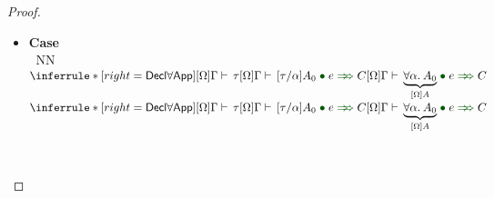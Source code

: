 \documentclass[a4paper]{article}
\makeatletter
\newcommand{\mathcolor}[2]{\text{\textcolor{#1}{\ensuremath{#2}}}}
\def\CompactJudgments{0}
\newcommand{\entails}{\mathrel{\ifnum\CompactJudgments=1\vdash \else \vdash\,\fi}}
\newcommand{\ctxoutsym}{\ifnum\CompactJudgments=1\dashv \else \,\dashv \fi}
\newcommand{\ctxout}[1]{\mathrel{\ctxoutsym}{#1}}
\newcommand{\Lemmaref}[1]{Lemma \ref{#1} (\nameref{#1})}   \newcommand{\Lemref}[1]{\Lemma \ref{#1}}   \newcommand{\Conjectureref}[1]{Conjecture \ref{#1}}
\gdef\xxDerivationProofCaseColor{N}
\newcommand{\DerivationProofCase}[3]{\smallskip
     \item \parbox[t]{100ex}{\textbf{Case } \\[-0.5em]
       $~$\hspace{5ex}
       \if\xxDerivationProofCaseColor N\ensuremath{\Infer{#1}{#2}{#3}}
       \else \colorbox{\xxDerivationProofCaseColor}{\ensuremath{\Infer{#1}{#2}{#3}}}\fi }\nopagebreak \\[-0.8ex]
  }
\newcommand{\BeginProof}{\renewcommand{\arraystretch}{1.1} \begin{tabular}[b]{r@{}r @{} l  l}}
\newcommand{\EndProof}{\end{tabular} \renewcommand{\arraystretch}{\mydefaultarraystretch}}
\newcommand{\Hand}{\text{\Pointinghand~~~~}}
\newcommand{\Pf}[4] {&$#1$ $#2$\, & $#3$ & #4 \\}
\newcommand{\Pfmrg}[3] {&$#1$\, & $#2$ & #3 \\}
\newcommand{\mkpf}[4] {\Pf{#2}{#1\,}{#3}{#4}}
\newcommand{\eqPf}[3] {\mkpf{=}{#1}{#2}{#3}}
\newcommand{\proofsep}{\,\\[-0.5em]}
\newenvironment{llproof}{\BeginProof}{\EndProof}
\newcommand{\ditto}{\ensuremath{''}}
\newcommand{\AllSym}{\forall}
\newcommand{\xAll}[1]{\AllSym#1}
\newcommand{\All}[1]{\xAll{#1}.\:}
\newcommand{\Infer}[3]{\inferrule*[right={\text{\strut#1}}]{{}#2\mathstrut}{{}#3\mathstrut}}
\newcommand{\substextendPf}[3] {\Pfmrg{{#1} \extendssym\,}{#2}{#3}}
\newcommand{\chkcolor}{dBlue}
\newcommand{\appcolor}{dDkGreen}
\newcommand{\chk}{\mathrel{\mathcolor{\chkcolor}{\Leftarrow}}}
\newcommand{\uncoloredsyn}{{\Rightarrow}}
\newcommand{\appsep}{\;{\mathcolor{\appcolor}{\bullet}}\;}
\newcommand{\app}{\mathrel{\mathcolor{\appcolor}{{\uncoloredsyn}\hspace{-1.2ex}{\uncoloredsyn}}}}
\newcommand{\declappjudg}[4]{\ensuremath{#1} \entails {#3} \appsep {#2}  \app {#4}}
\newcommand{\chkjudgPf}[5]{\Pf{#1}{\entails}{{#2} \chk {#3} \ctxout{#4}}{#5}}
\newcommand{\alltype}[1]{\All{#1}}
\newcommand{\extendssym}{\longrightarrow}
\newcommand{\extends}[2]{{#1} \extendssym {#2}}
\newcommand{\substextend}[2]{\extends{#1}{#2}}
\newcommand{\judgetp}[2]{{#1} \entails {#2}}
\newcommand{\rulename}[1]{\text{\normalfont\textsf{#1}}}
\newcommand{\Decltyrulename}[1]{\ensuremath{\rulename{Decl#1}}\xspace}
\newcommand{\DeclApprulename}[1]{\Decltyrulename{\ensuremath{#1}App}}
\newcommand{\DeclAllApp}{\DeclApprulename{\forall}}
\newcommand{\Tyrulename}[1]{\ensuremath{\rulename{#1}}\xspace}
\newcommand{\Introrulename}[1]{\Tyrulename{\ensuremath{#1}I}}
\newcommand{\AllIntro}{\Introrulename{\AllSym}}
\makeatother
\begin{document}
\begin{proof}
\begin{itemize}
           \begin{llproof}
             \chkjudgPf{\Gamma, \alpha}{e}{[\Gamma, \alpha]A'}{\Delta'}  {By i.h.}
             \substextendPf{\Delta'}{\Omega_0'}   {\ditto}
             \substextendPf{\Omega, \alpha}{\Omega_0'}   {\ditto}
             \substextendPf{\Gamma, \alpha}{\Delta'}  {By \Lemmaref{lem:typing-extension}}
             \eqPf{\Delta'} {\Delta, \alpha, \Theta}   {By \Lemmaref{lem:extension-order} (i)}
             \substextendPf{\Delta, \alpha, \Theta}{\Omega_0'}   {By above equality}
             \eqPf{\Omega_0'} {\Omega', \alpha, \Omega_Z}   {By \Lemmaref{lem:extension-order} (i)}
\Hand        \substextendPf{\Delta} {\Omega'}   {\ditto}
\Hand        \substextendPf{\Omega}{\Omega'}  {By \Lemmaref{lem:extension-order} on $\substextend{\Omega, \alpha}{\Omega_0'}$}
             \proofsep
             \chkjudgPf{\Gamma, \alpha}{e}{[\Gamma, \alpha]A'}{\Delta, \alpha, \Theta}   {By above equality}
             \chkjudgPf{\Gamma, \alpha}{e}{[\Gamma]A'}{\Delta, \alpha, \Theta}   {By definition of substitution}
             \chkjudgPf{\Gamma}{e}{\alltype{\alpha}{[\Gamma]A'}}{\Delta}   {By \AllIntro}
\Hand        \chkjudgPf{\Gamma}{e}{[\Gamma](\alltype{\alpha}{A'})}{\Delta}   {By definition of substitution}
           \end{llproof}


     \DerivationProofCase{\DeclAllApp}
            {\judgetp{[\Omega]\Gamma}{\tau}
              \\ 
             \declappjudg{[\Omega]\Gamma}{e}{[\tau/\alpha]A_0}{C}}
            {\declappjudg{[\Omega]\Gamma}{e}{\underbrace{\alltype{\alpha}A_0}_{[\Omega]A}}{C}}


\end{itemize}
\end{proof}
\end{document}
